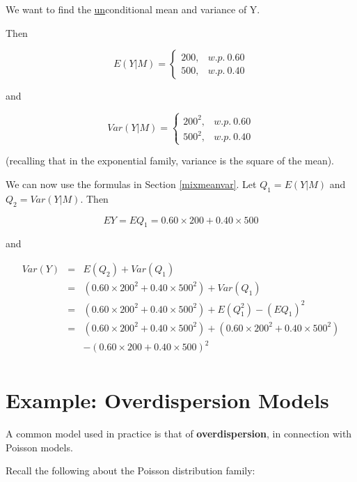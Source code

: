 We want to find the \underline{un}conditional mean and variance of Y.

Then

\begin{equation}
\label{batt1}
E(Y|M)=\left\{ \begin{array}{rl}
200, & w.p. ~ 0.60 \\
500, & w.p. ~ 0.40
\end{array}\right. 
\end{equation}

and 

\begin{equation}
\label{batt2}
Var(Y|M)=\left\{ \begin{array}{rl}
200^2, & w.p. ~ 0.60 \\
500^2, & w.p. ~ 0.40
\end{array}\right. 
\end{equation}

(recalling that in the exponential family, variance is the square of the
mean).

We can now use the formulas in Section \ref{mixmeanvar}.  Let $Q_1 =
E(Y|M)$  and $Q_2 = Var(Y|M)$.  Then

\begin{equation}
EY = EQ_1 = 0.60 \times 200 + 0.40 \times 500
\end{equation}

and 

\begin{eqnarray}
Var(Y) &=& E(Q_2) + Var(Q_1) \\
&=& (0.60 \times 200^2 + 0.40 \times 500^2) + Var(Q_1) \\
&=& (0.60 \times 200^2 + 0.40 \times 500^2) + E(Q_1^2) - (EQ_1)^2 \\
&=& (0.60 \times 200^2 + 0.40 \times 500^2) + (0.60 \times 200^2 + 0.40
\times 500^2)  \\
& & - (0.60 \times 200 + 0.40 \times 500)^2 \\
\end{eqnarray}

\section{Example:  Overdispersion Models}

A common model used in practice is that of {\bf overdispersion}, in
connection with Poisson models.  

Recall the following about the Poisson distribution family:

